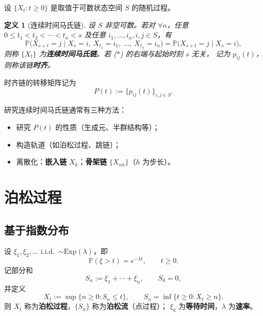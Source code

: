 \documentclass[lang=cn,10pt,newtx,thmcnt=chapter,mode=simple]{vividbook}
\providecommand{\Pp}{}\renewcommand{\Pp}{\mathbb{P}}
\theoremstyle{vividthm}
\theoremstyle{vividdef}
\newtheorem*{vividdefinition}{定义}
\theoremstyle{vividexa}
\theoremstyle{vividrem}
\renewenvironment{definition}[1][]{\begin{vividdefinition}[#1]}{\end{vividdefinition}}
\begin{document}
设 $\{X_t:t\ge0\}$ 是取值于可数状态空间 $S$ 的随机过程。

\begin{definition}[连续时间马氏链]
设 $S$ 非空可数。若对 $\forall n$，任意 $0\le t_1<t_2<\cdots<t_n<s$ 及任意
$i_1,\dots,i_n,i,j\in S$，有
\[
\Pp\bigl(X_{s+t}=j\mid X_s=i,\ X_{t_1}=i_1,\ \dots,\ X_{t_n}=i_n\bigr)
=\Pp\bigl(X_{s+t}=j\mid X_s=i\bigr),\tag{$*$}
\]
则称 $\{X_t\}$ 为\textbf{连续时间马氏链}。若 ($*$) 的右端与起始时刻 $s$ 无关，
记为 $p_{ij}(t)$，则称该链\textbf{时齐}。
\end{definition}

时齐链的转移矩阵记为
\[
P(t):=\bigl\{p_{ij}(t)\bigr\}_{i,j\in S}.
\]

\begin{center}
\end{center}

研究连续时间马氏链通常有三种方法：
\begin{itemize}
  \item 研究 $P(t)$ 的性质（生成元、半群结构等）；
  \item 构造轨道（如泊松过程、跳链）；
  \item 离散化：\textbf{嵌入链} $X_k$；\textbf{骨架链} $\{X_{nh}\}$（$h$ 为步长）。
\end{itemize}

\section{泊松过程}

\subsection{基于指数分布}

设 $\xi_1,\xi_2,\dots$ i.i.d.\ $\sim\mathrm{Exp}(\lambda)$，即
\[
\Pp(\xi>t)=e^{-\lambda t},\qquad t\ge0 .
\]
记部分和
\[
S_n:=\xi_1+\cdots+\xi_n,\qquad S_0=0,
\]
并定义
\[
X_t:=\sup\{n\ge0:S_n\le t\},\qquad S_n=\inf\{t\ge0:X_t\ge n\}.
\]
则 $X_t$ 称为\textbf{泊松过程}，$\{S_n\}$ 称为\textbf{泊松流}（点过程）；
$\xi_k$ 为\textbf{等待时间}，$\lambda$ 为\textbf{速率}。
\end{document}
